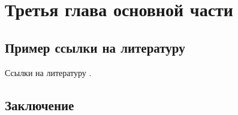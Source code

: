 \chapter{Третья глава основной части}\label{chap:3}

\section{Пример ссылки на литературу}

Ссылки на литературу \cite{NLPub,Ustalov:14}.

\section{Заключение}
